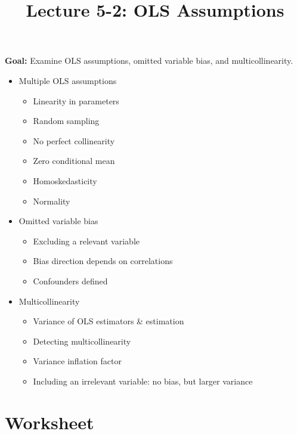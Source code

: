 \documentclass[12pt]{article}
\title{\Large Lecture 5-2: OLS Assumptions}
\author{}
\date{}
\begin{document}
\maketitle
\vspace{-6em}

\noindent \textbf{Goal:} Examine OLS assumptions, omitted variable bias, and multicollinearity.\medskip

\begin{itemize}\setlength{\itemsep}{1em}
\item Multiple OLS assumptions
\begin{itemize}
\item Linearity in parameters
\item Random sampling
\item No perfect collinearity
\item Zero conditional mean
\item Homoskedasticity
\item Normality
\end{itemize}
\item Omitted variable bias
\begin{itemize}
\item Excluding a relevant variable
\item Bias direction depends on correlations
\item Confounders defined
\end{itemize}
\item Multicollinearity
\begin{itemize}
\item Variance of OLS estimators \& estimation
\item Detecting multicollinearity
\item Variance inflation factor
\item Including an irrelevant variable: no bias, but larger variance
\end{itemize}
\end{itemize}

\clearpage


\section*{Worksheet}
\end{document}
